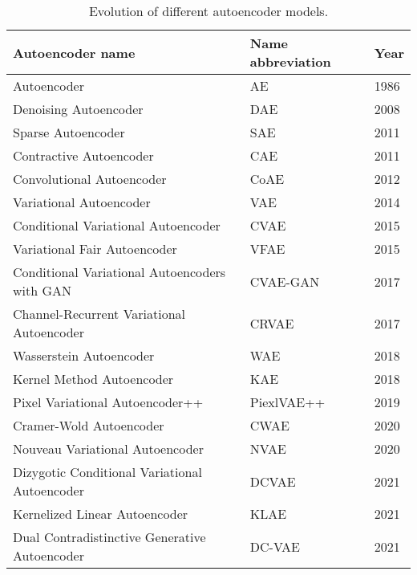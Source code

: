 \begin{table*}
    \centering
    \begin{tabular}{lll}
        \toprule
        Autoencoder name & Name abbreviation & Year \\
        \midrule
        Autoencoder & AE & 1986 \\
        Denoising Autoencoder & DAE & 2008 \\
        Sparse Autoencoder & SAE & 2011 \\
        Contractive Autoencoder & CAE & 2011 \\
        Convolutional Autoencoder & CoAE & 2012 \\
        Variational Autoencoder & VAE & 2014 \\
        Conditional Variational Autoencoder & CVAE & 2015 \\
        Variational Fair Autoencoder & VFAE & 2015 \\
        Conditional Variational Autoencoders with GAN & CVAE-GAN & 2017 \\
        Channel-Recurrent Variational Autoencoder & CRVAE & 2017 \\
        Wasserstein Autoencoder & WAE & 2018 \\
        Kernel Method Autoencoder & KAE & 2018 \\
        Pixel Variational Autoencoder++ & PiexlVAE++ & 2019 \\
        Cramer-Wold Autoencoder & CWAE & 2020 \\
        Nouveau Variational Autoencoder & NVAE & 2020 \\
        Dizygotic Conditional Variational Autoencoder & DCVAE & 2021 \\
        Kernelized Linear Autoencoder & KLAE & 2021 \\
        Dual Contradistinctive Generative Autoencoder & DC-VAE & 2021 \\
        \bottomrule
    \end{tabular}
    \caption{Evolution of different autoencoder models.}
    \label{table:vae:evolution}
\end{table*}
